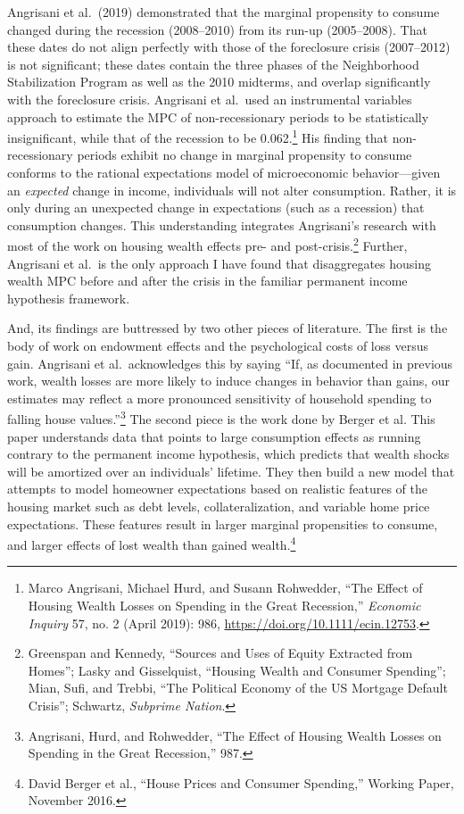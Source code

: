 \documentclass[12pt,oneside]{psthesis}
\begin{document}
Angrisani et al.~(2019) demonstrated that the marginal propensity to consume changed during the recession (2008--2010) from its run-up (2005--2008).
That these dates do not align perfectly with those of the foreclosure crisis (2007--2012) is not significant; these dates contain the three phases of the Neighborhood Stabilization Program as well as the 2010 midterms, and overlap significantly with the foreclosure crisis.
Angrisani et al.~used an instrumental variables approach to estimate the MPC of non-recessionary periods to be statistically insignificant, while that of the recession to be 0.062.\footnote{Marco Angrisani, Michael Hurd, and Susann Rohwedder, ``The Effect of Housing Wealth Losses on Spending in the Great Recession,'' \emph{Economic Inquiry} 57, no. 2 (April 2019): 986, \url{https://doi.org/10.1111/ecin.12753}.}
His finding that non-recessionary periods exhibit no change in marginal propensity to consume conforms to the rational expectations model of microeconomic behavior---given an \emph{expected} change in income, individuals will not alter consumption.
Rather, it is only during an unexpected change in expectations (such as a recession) that consumption changes.
This understanding integrates Angrisani's research with most of the work on housing wealth effects pre- and post-crisis.\footnote{Greenspan and Kennedy, ``Sources and Uses of Equity Extracted from Homes''; Lasky and Gisselquist, ``Housing Wealth and Consumer Spending''; Mian, Sufi, and Trebbi, ``The Political Economy of the US Mortgage Default Crisis''; Schwartz, \emph{Subprime Nation}.}
Further, Angrisani et al.~is the only approach I have found that disaggregates housing wealth MPC before and after the crisis in the familiar permanent income hypothesis framework.

And, its findings are buttressed by two other pieces of literature.
The first is the body of work on endowment effects and the psychological costs of loss versus gain.
Angrisani et al.~acknowledges this by saying ``If, as documented in previous work, wealth losses are more likely to induce changes in behavior than gains, our estimates may reflect a more pronounced sensitivity of household spending to falling house values.''\footnote{Angrisani, Hurd, and Rohwedder, ``The Effect of Housing Wealth Losses on Spending in the Great Recession,'' 987.}
The second piece is the work done by Berger et al.
This paper understands data that points to large consumption effects as running contrary to the permanent income hypothesis, which predicts that wealth shocks will be amortized over an individuals' lifetime.
They then build a new model that attempts to model homeowner expectations based on realistic features of the housing market such as debt levels, collateralization, and variable home price expectations.
These features result in larger marginal propensities to consume, and larger effects of lost wealth than gained wealth.\footnote{David Berger et al., ``House Prices and Consumer Spending,'' Working Paper, November 2016.}
\end{document}
